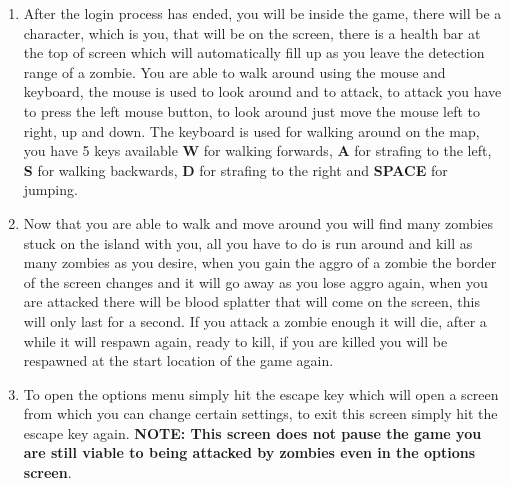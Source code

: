 \documentclass[letterpaper]{article}
\begin{document}
\begin{enumerate}
\begin{itemize}
		\end{itemize}
		
		\item After the login process has ended, you will be inside the game, there will be a character, which is you, that will be on the screen, there is a health bar at the top of screen which will automatically fill up as you leave the detection range of a zombie. You are able to walk around using the mouse and keyboard, the mouse is used to look around and to attack, to attack you have to press the left mouse button, to look around just move the mouse left to right, up and down. The keyboard is used for walking around on the map, you have 5 keys available \textbf{W} for walking forwards, \textbf{A} for strafing to the left, \textbf{S} for walking backwards, \textbf{D} for strafing to the right and \textbf{SPACE} for jumping. \\
		
		\item Now that you are able to walk and move around you will find many zombies stuck on the island with you, all you have to do is run around and kill as many zombies as you desire, when you gain the aggro of a zombie the border of the screen changes and it will go away as you lose aggro again, when you are attacked there will be blood splatter that will come on the screen, this will only last for a second. If you attack a zombie enough it will die, after a while it will respawn again, ready to kill, if you are killed you will be respawned at the start location of the game again. \\
		
		\item To open the options menu simply hit the escape key which will open a screen from which you can change certain settings, to exit this screen simply hit the escape key again. \textbf{NOTE: This screen does not pause the game you are still viable to being attacked by zombies even in the options screen}. \\
		

\end{enumerate}
\end{document}
